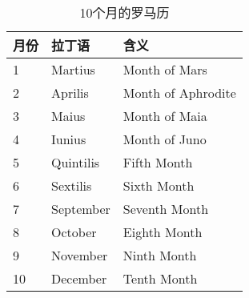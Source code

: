 \begin{table}[htbp]
  \centering
  \caption{10个月的罗马历}
  \label{tab:10-months-of-roman-calendar}
  \begin{minipage}{\textwidth}  %
  \centering
  \begin{tabular}{lll}
    \toprule
    月份 & 拉丁语    & 含义               \\\midrule
    1    & Martius   & Month of Mars      \\
    2    & Aprilis   & Month of Aphrodite \\
    3    & Maius     & Month of Maia      \\
    4    & Iunius    & Month of Juno      \\
    5    & Quintilis & Fifth Month        \\
    6    & Sextilis  & Sixth Month        \\
    7    & September & Seventh Month      \\
    8    & October   & Eighth Month       \\
    9    & November  & Ninth Month        \\
    10   & December  & Tenth Month        \\
    \bottomrule
  \end{tabular}
  \end{minipage}
\end{table}


